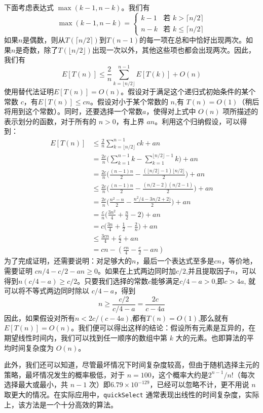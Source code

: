 下面考虑表达式 $\max(k-1,n-k)$。我们有\[\max(k-1,n-k)=\begin{cases}k-1&\text{若 }k>\lceil n/2\rceil\\n-k&\text{若 }k\leq \lceil n/2\rceil\end{cases}\]
如果$n$是偶数，则从$T(\lceil n/2\rceil)$到$T(n-1)$的每一项在总和中恰好出现两次。如果$n$是奇数，除了$T(\lfloor n/2\rfloor)$出现一次以外，其他这些项也都会出现两次。因此，我们有\[E [T(n)]\leq \frac{2}{n}\sum_{k=\lfloor n/2\rfloor}^{n-1}E [T(k)]+O(n)\]
使用替代法证明$E[T(n)]=O(n)$。假设对于满足这个递归式初始条件的某个常数 $c$，有$E[T(n)]\leq  cn$。假设对小于某个常数的 $n$,有 $T(n)=O(1)$（稍后将用到这个常数）。同时，还要选择一个常数$a$，使得对上式中 $O(n)$ 项所描述的表示划分的函数，对于所有的 $n>0$，有上界 $an$。利用这个归纳假设，可以得到：\begin{align*}
    E[T(n)]& \leq \frac{2}{n}\sum_{k=\lfloor n/2\rfloor}^{n-1}ck+an \\
    &=\frac{2c}{n}\Big(\sum_{k=1}^{n-1}k-\sum_{k=1}^{\lfloor n/2\rfloor-1}k\Big)+an \\
    &=\frac{2c}{n}\Big(\frac{(n-1)n}{2}-\frac{(\lfloor n/2\rfloor-1)\lfloor n/2\rfloor}{2}\Big)+an \\
    &\leq \frac{2c}{n}\Big(\frac{(n-1)n}{2}-\frac{(n/2-2)(n/2-1)}{2}\Big)+an \\
    &=\frac{2c}{n}\Big(\frac{n^{2}-n}{2}-\frac{n^{2}/4-3n/2+2)}{2}\Big)+an \\
    &=\frac{c}{n}\Big(\frac{3n^{2}}{4}+\frac{n}{2}-2\Big)+an \\
    &=c\Big(\frac{3n}{4}+\frac{1}{2}-\frac{2}{n}\Big)+an \\
    &\leq \frac{3cn}4+\frac{c}2+an \\
    &=cn-\left(\frac{cn}4-\frac c2-an\right)
\end{align*}
为了完成证明，还需要说明：对足够大的$n$，最后一个表达式至多是$cn$，等价地，需要证明 $cn/4-c/2-an\geq0$。如果在上式两边同时加$c/2$,并且提取因子$n$，可以得到$n(c/4-a)\geq c/2$。只要我们选择的常数$c$能够满足$c/4-a>0$,即$c> 4a$, 就可以将不等式两边同时除以 $c/ 4- a$，得到\[n\geq\frac{c/2}{c/4-a}=\frac{2c}{c-4a}\]
因此，如果假设对所有$n<2c/(c-4a)$,都有$T(n)=O(1)$,那么就有 $E[T(n)]=O(n)$。我们便可以得出这样的结论：假设所有元素是互异的，在期望线性时间内，我们可以找到任一顺序的数组中第 $k$ 大的元素。也即算法的平均时间复杂度为 $O(n)$。

此外，我们还可以知道，尽管最坏情况下时间复杂度较高，但由于随机选择主元的策略，最坏情况发生的概率极低，对于 $n = 100$，这个概率大约是$2^{n-1}/n!$（每次选择最大或最小，共 $n-1$ 次）即$6.79\times10^{-129}$，已经可以忽略不计，更不用说 $n$ 取更大的情况。在实际应用中，\texttt{quickSelect} 通常表现出线性的时间复杂度，实际上，该方法是一个十分高效的算法。

